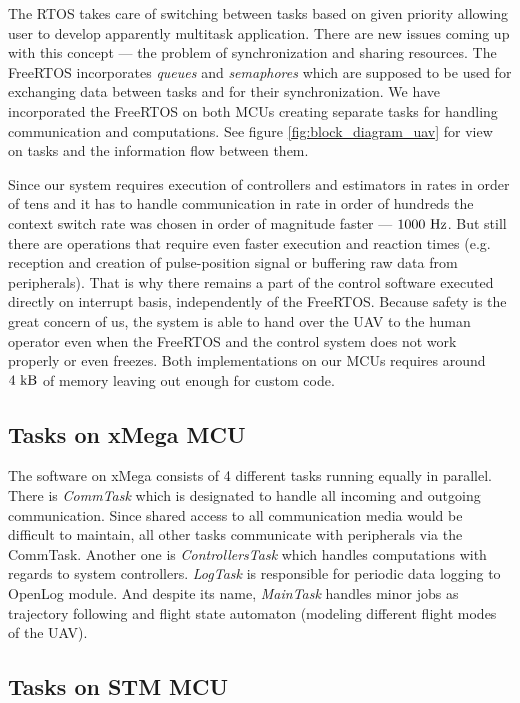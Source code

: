 The RTOS takes care of switching between tasks based on given priority allowing user to develop apparently multitask application. There are new issues coming up with this concept --- the problem of synchronization and sharing resources. The FreeRTOS incorporates \textit{queues} and \textit{semaphores} which are supposed to be used for exchanging data between tasks and for their synchronization. We have incorporated the FreeRTOS on both MCUs creating separate tasks for handling communication and computations. See figure \ref{fig:block_diagram_uav} for view on tasks and the information flow between them.

Since our system requires execution of controllers and estimators in rates in order of tens and it has to handle communication in rate in order of hundreds the context switch rate was chosen in order of magnitude faster --- $1000~\mathrm{Hz}$. But still there are operations that require even faster execution and reaction times (e.g. reception and creation of pulse-position signal or buffering raw data from peripherals). That is why there remains a part of the control software executed directly on interrupt basis, independently of the FreeRTOS. Because safety is the great concern of us, the system is able to hand over the UAV to the human operator even when the FreeRTOS and the control system does not work properly or even freezes. Both implementations on our MCUs requires around $4~\mathrm{kB}$ of memory leaving out enough for custom code.

\subsection{Tasks on xMega MCU}

The software on xMega consists of 4 different tasks running equally in parallel. There is \emph{CommTask} which is designated to handle all incoming and outgoing communication. Since shared access to all communication media would be difficult to maintain, all other tasks communicate with peripherals via the CommTask. Another one is \emph{ControllersTask} which handles computations with regards to system controllers. \emph{LogTask} is responsible for periodic data logging to OpenLog module. And despite its name, \emph{MainTask} handles minor jobs as trajectory following and flight state automaton (modeling different flight modes of the UAV). 

\subsection{Tasks on STM MCU}


